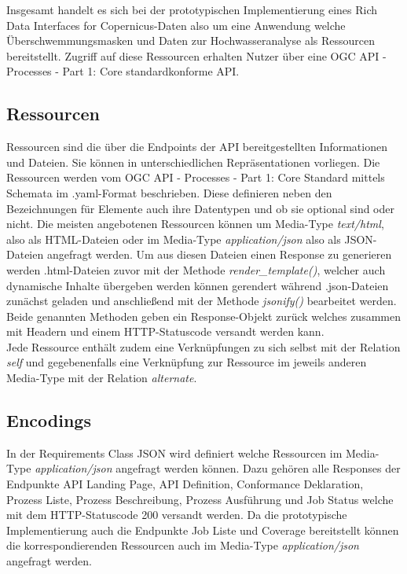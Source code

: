 Insgesamt handelt es sich bei der prototypischen Implementierung eines Rich Data Interfaces for Copernicus-Daten also um eine Anwendung welche Überschwemmungsmasken und Daten zur Hochwasseranalyse als Ressourcen bereitstellt.
Zugriff auf diese Ressourcen erhalten Nutzer über eine OGC API - Processes - Part 1: Core standardkonforme API. 

\subsection{Ressourcen}
Ressourcen sind die über die Endpoints der API bereitgestellten Informationen und Dateien. Sie können in unterschiedlichen Repräsentationen vorliegen. 
Die Ressourcen werden vom OGC API - Processes - Part 1: Core Standard mittels Schemata im .yaml-Format beschrieben. 
Diese definieren neben den Bezeichnungen für Elemente auch ihre Datentypen und ob sie optional sind oder nicht. 
Die meisten angebotenen Ressourcen können um Media-Type \textit{text/html}, also als HTML-Dateien oder im Media-Type \textit{application/json} also als 
JSON-Dateien angefragt werden. Um aus diesen Dateien einen Response zu generieren werden .html-Dateien zuvor mit der Methode \textit{render\_template()}, welcher auch 
dynamische Inhalte übergeben werden können gerendert während .json-Dateien zunächst geladen und anschließend 
mit der Methode \textit{jsonify()} bearbeitet werden. Beide genannten Methoden
geben ein Response-Objekt zurück welches zusammen mit Headern und einem HTTP-Statuscode versandt werden kann. \\

Jede Ressource enthält zudem eine Verknüpfungen zu sich selbst mit der Relation \textit{self} und gegebenenfalls eine Verknüpfung 
zur Ressource im jeweils anderen Media-Type mit der Relation \textit{alternate}. 

\subsection{Encodings}
In der Requirements Class JSON wird definiert welche Ressourcen im Media-Type \textit{application/json} angefragt werden können. Dazu gehören alle Responses der 
Endpunkte API Landing Page, API Definition, Conformance Deklaration, Prozess Liste, Prozess Beschreibung, Prozess Ausführung und Job Status welche mit dem 
HTTP-Statuscode 200 versandt werden. Da die prototypische Implementierung auch die Endpunkte Job Liste und Coverage bereitstellt können die korrespondierenden
Ressourcen auch im Media-Type \textit{application/json} angefragt werden.\\

